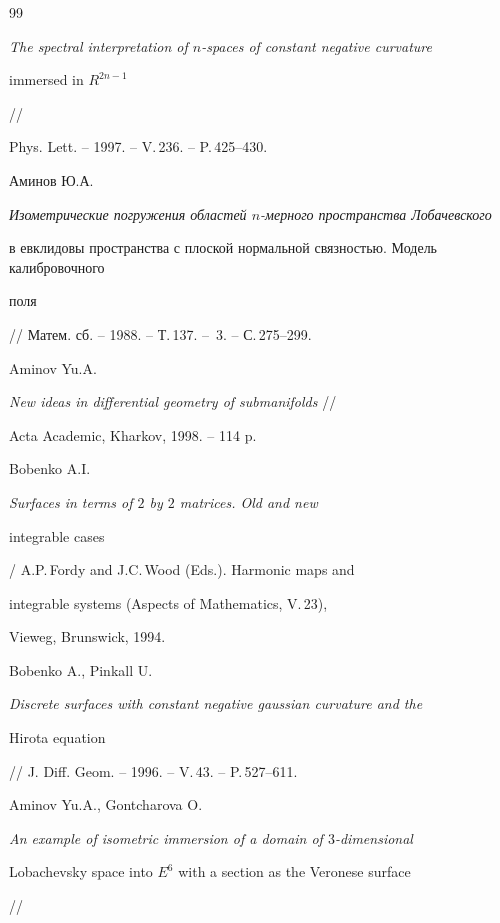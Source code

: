 \begin{thebibliography}{99}
{\em The spectral interpretation of $n$-spaces of constant negative curvature


immersed in $R^{2n-1}$} //


Phys. Lett. -- 1997. -- V.\,236. -- P.\,425--430.







Аминов Ю.А.


{\em Изометрические погружения областей $n$-мерного пространства Лобачевского


в евклидовы пространства с плоской нормальной связностью. Модель калибровочного 


поля} // Матем. сб. -- 1988. -- Т.\,137. -- \No\,3. -- С.\,275--299.


 




Aminov Yu.A.


{\it New ideas in differential geometry of submanifolds} //


Acta Academic, Kharkov, 1998. -- 114 p.







Bobenko A.I. {\em Surfaces in terms of $2$ by $2$ matrices. Old and new


integrable cases} / A.P.\,Fordy and J.C.\,Wood (Eds.). Harmonic maps and 


integrable systems (Aspects of Mathematics, V.\,23),


Vieweg, Brunswick, 1994. 







Bobenko A., Pinkall U.


{\em Discrete surfaces with constant negative gaussian curvature and the


Hirota equation} // J. Diff. Geom. -- 1996. -- V.\,43. -- P.\,527--611.







Aminov Yu.A., Gontcharova O.


{\em An example of isometric immersion of a domain of $3$-dimensional 


Lobachevsky space into $E^6$ with a section as the Veronese surface} //



\end{thebibliography}
